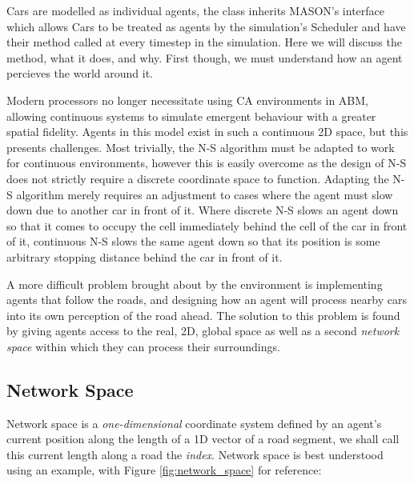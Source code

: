 Cars are modelled as individual agents, the  class inherits MASON's  interface which allows Cars to be treated as agents by the simulation's Scheduler and have their  method called at every timestep in the simulation. Here we will discuss the  method, what it does, and why. First though, we must understand how an agent percieves the world around it.

Modern processors no longer necessitate using CA environments in ABM, allowing continuous systems to simulate emergent behaviour with a greater spatial fidelity. Agents in this model exist in such a continuous 2D space, but this presents challenges. Most trivially, the N-S algorithm must be adapted to work for continuous environments, however this is easily overcome as the design of N-S does not strictly require a discrete coordinate space to function. Adapting the N-S algorithm merely requires an adjustment to cases where the agent must slow down due to another car in front of it. Where discrete N-S slows an agent down so that it comes to occupy the cell immediately behind the cell of the car in front of it, continuous N-S slows the same agent down so that its position is some arbitrary stopping distance behind the car in front of it.

A more difficult problem brought about by the environment is implementing agents that follow the roads, and designing how an agent will process nearby cars into its own perception of the road ahead. The solution to this problem is found by giving agents access to the real, 2D, global space as well as a second \textit{network space} within which they can process their surroundings.

\subsection{Network Space}

Network space is a \textit{one-dimensional} coordinate system defined by an agent's current position along the length of a 1D vector of a road segment, we shall call this current length along a road the \textit{index}. Network space is best understood using an example, with Figure \ref{fig:network_space} for reference:

